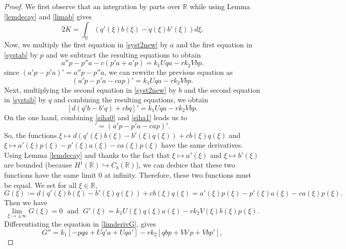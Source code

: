 \documentclass[10pt,a4paper]{amsart}
\def \R {\mathbb{R}}
\begin{document}
\begin{proof}
We first observe that an integration by parts over $\R$ while using Lemma \ref{lemdecay} and \eqref{limab} gives
\begin{equation}\label{important0}
	2K= \int_{\R}\left(q'(\xi)b(\xi)-q(\xi)b'(\xi) \right)d\xi. 
\end{equation}
Now, we multiply the first equation in \eqref{syst2new} by $a$ and the first equation in \eqref{systab} by $p$ and we subtract the resulting equations to obtain
\begin{equation*}
a''p-p''a-c(p'a+a'p)=k_1Uqa-rk_2Vbp.
\end{equation*}
since $(a'p-p'a)'=a''p-p''a$, we can rewrite the previous equation as 
\begin{equation}\label{siha0}
	(a'p-p'a-cap)'=k_1Uqa-rk_2Vbp.
\end{equation}
Next, multiplying the second equation in \eqref{syst2new} by $b$ and the second equation in \eqref{systab} by $q$ and combining the resulting equations, we obtain
\begin{equation}\label{siha1}
	[d(q'b-b'q)+cbq]'=k_1Uqa-rk_2Vbp.
\end{equation}
On the one hand, combining \eqref{siha0} and \eqref{siha1} leads us to 
\begin{equation*}
	[d(q'b-b'q)+cbq]'=(a'p-p'a-cap)'.
\end{equation*}
So, the functions $\xi \mapsto d(q'(\xi)b(\xi)-b'(\xi)q(\xi))+cb(\xi)q(\xi)$ and $\xi \mapsto a'(\xi)p(\xi)-p'(\xi)a(\xi)-ca(\xi)p(\xi)$ have the same derivatives. Using Lemma \ref{lemdecay} and thanks to the fact that $\xi \mapsto a'(\xi)$ and $\xi\mapsto b'(\xi)$ are bounded (because $H^1(\R)\hookrightarrow  C_b(\R)$), we can deduce that these two functions have the same limit $0$ at infinity. Therefore, these two functions must be equal. We set for all $\xi \in \R$,
\begin{equation}\label{defG}
G(\xi):=d(q'(\xi)b(\xi)-b'(\xi)q(\xi))+cb(\xi)q(\xi)=a'(\xi)p(\xi)-p'(\xi)a(\xi)-ca(\xi)p(\xi).
\end{equation} 
Then we have 
\begin{equation}\label{limderivG}
\lim_{\xi\to \pm\infty}G(\xi)=0  \;  \text{ and } \; G'(\xi)= k_1U(\xi)q(\xi)a(\xi)-rk_2V(\xi)b(\xi)p(\xi).
\end{equation}
Differentiating the equation in \eqref{limderivG}, gives
\begin{equation}\label{siha2}
G''=k_1\left[-pqa+ Uq'a+Uqa'\right] -rk_2\left[qbp+Vb'p+Vbp'\right],
\end{equation}

\end{proof}
\end{document}
